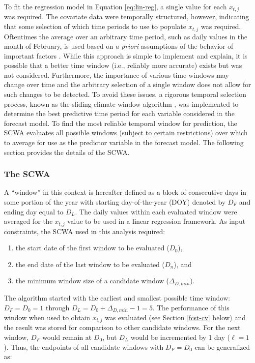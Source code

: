 \documentclass[12pt,]{book}
\providecommand{\tightlist}{%
  \setlength{\itemsep}{0pt}\setlength{\parskip}{0pt}}
\theoremstyle{definition}
\theoremstyle{definition}
\theoremstyle{definition}
\theoremstyle{remark}
\begin{document}
\noindent
To fit the regression model in Equation \eqref{eq:lin-reg}, a single value
for each \(x_{t,j}\) was required. The covariate data were temporally
structured, however, indicating that some selection of which time
periods to use to populate \(x_{t,j}\) was required. Oftentimes the
average over an arbitrary time period, such as daily values in the month
of February, is used based on \emph{a priori} assumptions of the
behavior of important factors \citep{vandepol-etal-2016}. While this
approach is simple to implement and explain, it is possible that a
better time window (i.e., reliably more accurate) exists but was not
considered. Furthermore, the importance of various time windows may
change over time and the arbitrary selection of a single window does not
allow for such changes to be detected. To avoid these issues, a rigorous
temporal selection process, known as the sliding climate window
algorithm \citep[SCWA;][]{vandepol-etal-2016}, was implemented to
determine the best predictive time period for each variable considered
in the forecast model. To find the most reliable temporal window for
prediction, the SCWA evaluates all possible windows (subject to certain
restrictions) over which to average for use as the predictor variable in
the forecast model. The following section provides the details of the
SCWA.

\subsubsection{The SCWA}\label{the-scwa}

\noindent
A ``window'' in this context is hereafter defined as a block of
consecutive days in some portion of the year with starting
day-of-the-year (DOY) denoted by \(D_F\) and ending day equal to
\(D_L\). The daily values within each evaluated window were averaged for
the \(x_{t,j}\) value to be used in a linear regression framework. As
input constraints, the SCWA used in this analysis required:

\begin{enumerate}
\def\labelenumi{(\arabic{enumi})}
\tightlist
\item
  the start date of the first window to be evaluated (\(D_0\)),
\item
  the end date of the last window to be evaluated (\(D_n\)), and
\item
  the minimum window size of a candidate window (\(\Delta_{D,min}\)).
\end{enumerate}

\noindent
The algorithm started with the earliest and smallest possible time
window: \(D_F = D_0 = 1\) through
\(D_L = D_0 + \Delta_{D,min} - 1 = 5\). The performance of this window
when used to obtain \(x_{t,j}\) was evaluated (see Section \ref{fcst-cv}
below) and the result was stored for comparison to other candidate
windows. For the next window, \(D_F\) would remain at \(D_0\), but
\(D_L\) would be incremented by 1 day (\(\ell=1\)). Thus, the endpoints
of all candidate windows with \(D_F = D_0\) can be generalized as:
\end{document}
